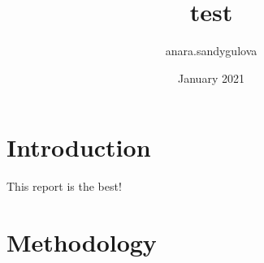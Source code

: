 \documentclass{article}
\title{test}
\author{anara.sandygulova }
\date{January 2021}
\begin{document}
\maketitle

\section{Introduction}
This report is the best!

\section{Methodology}
\end{document}

